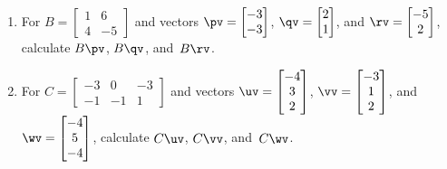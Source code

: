 \begin{exercise}
\begin{enumerate}
\item For \(B=\begin{bmatrix} 1&6
\\4&-5 \end{bmatrix}\) and vectors 
\(\pv=\begin{bmatrix} -3\\-3 \end{bmatrix}\), 
\(\qv=\begin{bmatrix} 2\\1 \end{bmatrix}\), and
\(\rv=\begin{bmatrix} -5\\2 \end{bmatrix}\), 
calculate  \(B\pv\), \(B\qv\), and~\(B\rv\).


\item For \(C=\begin{bmatrix} -3&0&-3
\\-1&-1&1 \end{bmatrix}\) and vectors 
\(\uv=\begin{bmatrix} -4\\3\\2 \end{bmatrix}\), 
\(\vv=\begin{bmatrix} -3\\1\\2 \end{bmatrix}\), and
\(\wv=\begin{bmatrix} -4\\5\\-4 \end{bmatrix}\), 
calculate  \(C\uv\), \(C\vv\), and~\(C\wv\).



\end{enumerate}
\end{exercise}
